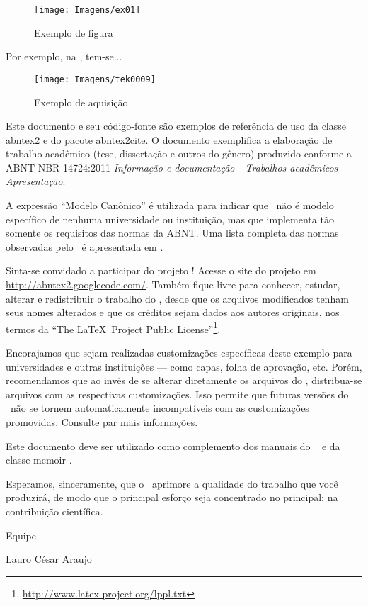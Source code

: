 \begin{figure}
	\centering
	\caption{Exemplo de figura}
	\texttt{[image: Imagens/ex01]}
	\label{fig:ex01}
\end{figure}

Por exemplo, na , tem-se...


\begin{figure}
	\centering
	\texttt{[image: Imagens/tek0009]}
	\caption{Exemplo de aquisição}
	\label{fig:tek0009}
\end{figure}

Este documento e seu código-fonte são exemplos de referência de uso da classe
\textsf{abntex2} e do pacote \textsf{abntex2cite}. O documento
exemplifica a elaboração de trabalho acadêmico (tese, dissertação e outros do
gênero) produzido conforme a ABNT NBR 14724:2011 \emph{Informação e documentação
- Trabalhos acadêmicos - Apresentação}.

A expressão ``Modelo Canônico'' é utilizada para indicar que \abnTeX\ não é
modelo específico de nenhuma universidade ou instituição, mas que implementa tão
somente os requisitos das normas da ABNT. Uma lista completa das normas
observadas pelo \abnTeX\ é apresentada em .

Sinta-se convidado a participar do projeto \abnTeX! Acesse o site do projeto em
\url{http://abntex2.googlecode.com/}. Também fique livre para conhecer,
estudar, alterar e redistribuir o trabalho do \abnTeX, desde que os arquivos
modificados tenham seus nomes alterados e que os créditos sejam dados aos
autores originais, nos termos da ``The \LaTeX\ Project Public
License''\footnote{\url{http://www.latex-project.org/lppl.txt}}.

Encorajamos que sejam realizadas customizações específicas deste exemplo para
universidades e outras instituições --- como capas, folha de aprovação, etc.
Porém, recomendamos que ao invés de se alterar diretamente os arquivos do
\abnTeX, distribua-se arquivos com as respectivas customizações.
Isso permite que futuras versões do \abnTeX~não se tornem automaticamente
incompatíveis com as customizações promovidas. Consulte
 par mais informações.

Este documento deve ser utilizado como complemento dos manuais do \abnTeX\
\cite{abntex2classe,abntex2cite,abntex2cite-alf} e da classe \textsf{memoir}
\cite{memoir}.

Esperamos, sinceramente, que o \abnTeX\ aprimore a qualidade do trabalho que
você produzirá, de modo que o principal esforço seja concentrado no principal:
na contribuição científica.

Equipe \abnTeX

Lauro César Araujo


